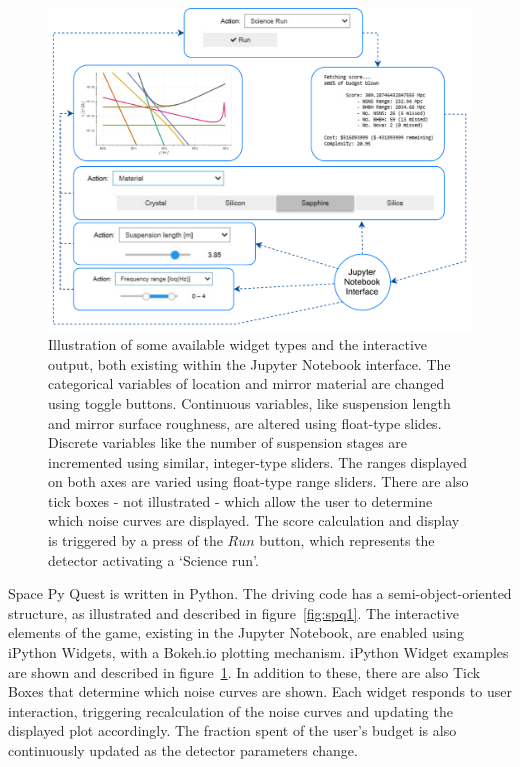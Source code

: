 \documentclass{article}
\begin{document}
\clearpage
\begin{figure}[h!]
    \centering
    \includegraphics[scale=0.75]{close-up.pdf}
    \caption{Illustration of some available widget types and the
      interactive output, both existing within the Jupyter Notebook
      interface. The categorical variables of location and mirror
      material are changed using toggle buttons. Continuous variables,
      like suspension length and mirror surface roughness, are altered
      using float-type slides. Discrete variables like the number of
      suspension stages are incremented using similar, integer-type
      sliders. The ranges displayed on both axes are varied using
      float-type range sliders. There are also tick boxes - not
      illustrated - which allow the user to determine which noise
      curves are displayed. The score calculation and display is
      triggered by a press of the $Run$ button, which represents the
      detector activating a `Science run'.}
    \label{fig:spq2}
\end{figure}
\clearpage
Space Py Quest is written in Python. The driving code has a
semi-object-oriented structure, as illustrated and described in
figure~\ref{fig:spq1}. The interactive elements of the game, existing
in the
Jupyter Notebook, are enabled using iPython Widgets, with a Bokeh.io
plotting mechanism. iPython Widget examples are shown and described in
figure~\ref{fig:spq2}. In addition to these, there are also Tick Boxes
that determine which noise curves are shown. Each widget responds to
user interaction, triggering recalculation of the noise curves and
updating the displayed plot accordingly. The fraction spent of the
user's budget is also continuously updated as the detector parameters
change.
\end{document}
